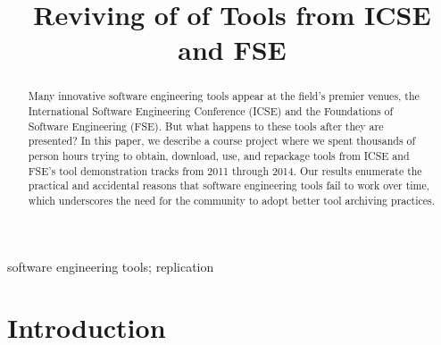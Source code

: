 \documentclass[10pt,conference]{IEEEtran}
\begin{document}

\title{Reviving \workingNum of \totalToolsTried of Tools from ICSE and FSE}

\author{
}

\maketitle
\begin{abstract}
Many innovative software engineering tools appear at the field's premier venues, the 
International Software Engineering Conference (ICSE) and the 
Foundations of Software Engineering (FSE).
But what happens to these tools after they are presented?
In this paper, we describe a course project where we spent 
thousands of person hours
trying to obtain, download, use, and repackage \totalToolsTried
tools from ICSE and FSE's tool demonstration tracks from
2011 through 2014.
Our results enumerate the practical and accidental reasons that
software engineering tools fail to work over time,
which underscores the need for the community to adopt better
tool archiving practices.
\end{abstract}

\begin{IEEEkeywords}
software engineering tools; replication
\end{IEEEkeywords}

\section{Introduction}
\end{document}

